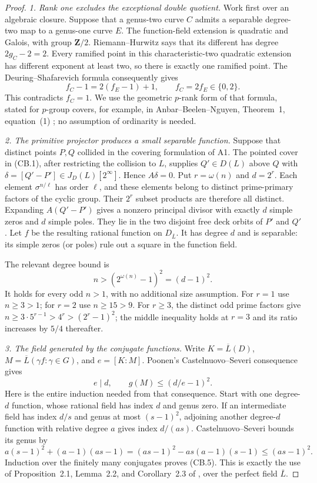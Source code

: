 \documentclass[11pt,a4paper]{article}
\begin{document}
\begin{proof}
\emph{1. Rank one excludes the exceptional double quotient.}
Work first over an algebraic closure. Suppose that a genus-two curve
$C$ admits a separable degree-two map to a genus-one curve $E$.
The function-field extension is quadratic and Galois, with group
$\mathbf Z/2$. Riemann--Hurwitz says that its different has degree
$2g_C-2=2$. Every ramified point in this characteristic-two quadratic
extension has different exponent at least two, so there is exactly
one ramified point. The Deuring--Shafarevich formula consequently gives
\[
 f_C-1=2(f_E-1)+1,\qquad f_C=2f_E\in\{0,2\}.              \tag{CB.3}
\]
This contradicts $f_C=1$. We use the geometric $p$-rank form of that
formula, stated for $p$-group covers, for example, in
Anbar--Beelen--Nguyen, Theorem~1, equation~(1)
\cite{AnbarBeelenNguyenP}; no assumption of ordinarity is needed.

\emph{2. The primitive projector produces a small separable function.}
Suppose that distinct points $P,Q$ collided in the covering formulation
of A1. The pointed cover in (CB.1), after restricting the collision
to $L$, supplies $Q'\in D(L)$ above $Q$ with
$\delta=[Q'-P']\in J_D(L)[2^\infty]$. Hence $A\delta=0$.
Put $r=\omega(n)$ and $d=2^r$. Each element
$\sigma^{n/\ell}$ has order $\ell$, and these elements belong to
distinct prime-primary factors of the cyclic group. Their $2^r$
subset products are therefore all distinct. Expanding $A(Q'-P')$
gives a nonzero principal divisor with exactly $d$ simple zeros and
$d$ simple poles. They lie in the two disjoint free deck orbits of
$P'$ and $Q'$. Let $f$ be the resulting rational function on
$D_{\overline L}$. It has degree $d$ and is separable: its simple
zeros (or poles) rule out a square in the function field.

The relevant degree bound is
\[
                         n>(2^{\omega(n)}-1)^2=(d-1)^2.
                                                               \tag{CB.4}
\]
It holds for every odd $n>1$, with no additional size assumption.
For $r=1$ use $n\ge3>1$; for $r=2$ use $n\ge15>9$.
For $r\ge3$, the distinct odd prime factors give
$n\ge3\cdot5^{r-1}>4^r>(2^r-1)^2$; the middle inequality holds
at $r=3$ and its ratio increases by $5/4$ thereafter.

\emph{3. The field generated by the conjugate functions.}
Write $K=\overline L(D)$,
$M=\overline L(\gamma f:\gamma\in G)$, and $e=[K:M]$.
Poonen's Castelnuovo--Severi consequence gives
\[
                  e\mid d,\qquad g(M)\le(d/e-1)^2.
                                                               \tag{CB.5}
\]
Here is the entire induction needed from that consequence. Start with
one degree-$d$ function, whose rational field has index $d$ and genus
zero. If an intermediate field has index $d/s$ and genus at most
$(s-1)^2$, adjoining another degree-$d$ function with relative degree
$a$ gives index $d/(as)$. Castelnuovo--Severi bounds its genus by
\[
 a(s-1)^2+(a-1)(as-1)
  =(as-1)^2-as(a-1)(s-1)\le(as-1)^2.
\]
Induction over the finitely many conjugates proves (CB.5).
This is exactly the use of Proposition~2.1, Lemma~2.2, and
Corollary~2.3 of \cite{Poonen2007Gonality}, over the perfect field
$\overline L$.


\end{proof}
\end{document}
